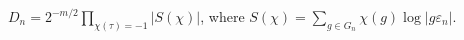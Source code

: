 $D_n=2^{-m/2}\prod_{\chi(\tau)=-1}|S(\chi)|$, where $S(\chi)=\sum_{g\in G_n}\chi(g)\log|g\varepsilon_n|$.
